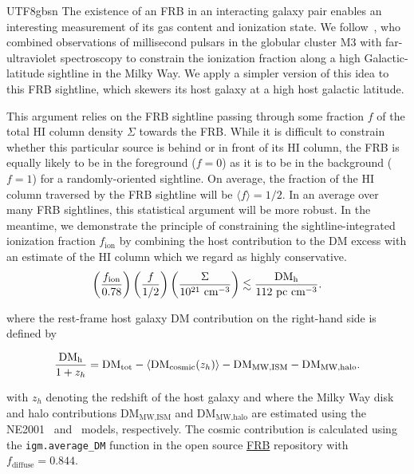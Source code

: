 \documentclass[twocolumn,linenumbers]{aastex631}
\newcommand{\dmh}{\ensuremath{{\rm DM}_\textrm{h}}}
\begin{document}
\begin{CJK*}{UTF8}{gbsn}
The existence of an FRB in an interacting galaxy pair enables an interesting measurement of its gas content and ionization state. We follow~\citet{howk2003ionized,howk2006method}, who combined observations of millisecond pulsars in the globular cluster M3 with far-ultraviolet spectroscopy to constrain the ionization fraction along a high Galactic-latitude sightline in the Milky Way. We apply a simpler version of this idea to this FRB sightline, which skewers its host galaxy at a high host galactic latitude. 

This argument relies on the FRB sightline passing through some fraction $f$ of the total HI column density $\Sigma$ towards the FRB. While it is difficult to constrain whether this particular source is behind or in front of its HI column, the FRB is equally likely to be in the foreground ($f = 0$) as it is to be in the background ($f = 1$) for a randomly-oriented sightline. On average, the fraction of the HI column traversed by the FRB sightline will be $\langle f \rangle = 1/2$. In an average over many FRB sightlines, this statistical argument will be more robust. In the meantime, we demonstrate the principle of constraining the sightline-integrated ionization fraction $f_\mathrm{ion}$ by combining the host contribution to the DM excess with an estimate of the HI column which we regard as highly conservative.
$$\left(\dfrac{f_\mathrm{ion}}{0.78}\right)\left(\dfrac{f}{1/2}\right)\left(\dfrac{ \Sigma}{10^{21}\textrm{ cm}^{-3}}\right) \lesssim \dfrac{\dmh}{112\textrm{ pc cm}^{-3}}.$$

\noindent where the rest-frame host galaxy DM contribution on the right-hand side is defined by

\begin{equation}
\dfrac{\dmh}{1 + z_h} = \textrm{DM}_\mathrm{tot} - \langle \textrm{DM}_\textrm{cosmic}(z_h)\rangle - \textrm{DM}_{\textrm{MW,ISM}} - \textrm{DM}_{\textrm{MW,halo}}.
\label{eq:dmh_definition}
\end{equation}

\noindent with $z_h$ denoting the redshift of the host galaxy and where the Milky Way disk and halo contributions  $\textrm{DM}_{\textrm{MW,ISM}}$ and $\textrm{DM}_{\textrm{MW,halo}}$ are estimated using the NE2001~\citep{cordes2002ne2001} and~\citet{yamasaki2020galactic} models, respectively. The cosmic contribution is calculated using the \texttt{igm.average\_DM} function in the open source \href{https://github.com/FRBs/FRB/blob/main/frb/dm/igm.py}{FRB} repository with $f_\textrm{diffuse} = 0.844$.


\end{CJK*}
\end{document}
